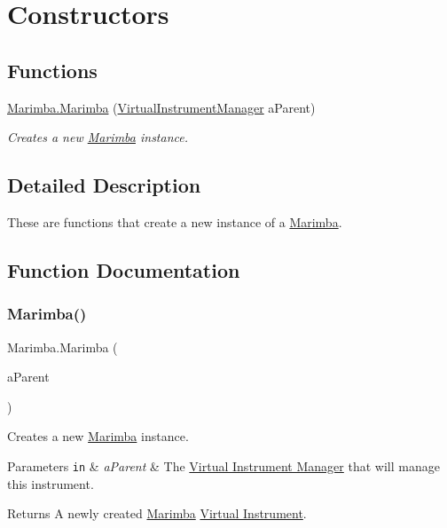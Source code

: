 \hypertarget{group___mar_construct}{}\section{Constructors}
\label{group___mar_construct}
\subsection*{Functions}
\begin{DoxyCompactItemize}
\item 
\hyperlink{group___mar_construct_ga48c946fe0f78f8905a8e4d063cbc0fa2}{Marimba.\+Marimba} (\hyperlink{class_virtual_instrument_manager}{Virtual\+Instrument\+Manager} a\+Parent)
\begin{DoxyCompactList}\small\item\em Creates a new \hyperlink{class_marimba}{Marimba} instance. \end{DoxyCompactList}\end{DoxyCompactItemize}


\subsection{Detailed Description}
These are functions that create a new instance of a \hyperlink{class_marimba}{Marimba}. 

\subsection{Function Documentation}
\mbox{\label{group___mar_construct_ga48c946fe0f78f8905a8e4d063cbc0fa2}} 
\subsubsection{\texorpdfstring{Marimba()}{Marimba()}}
{\footnotesize\ttfamily Marimba.\+Marimba (\begin{DoxyParamCaption}\item[{\hyperlink{class_virtual_instrument_manager}{Virtual\+Instrument\+Manager}}]{a\+Parent }\end{DoxyParamCaption})}



Creates a new \hyperlink{class_marimba}{Marimba} instance. 


\begin{DoxyParams}[1]{Parameters}
\mbox{\tt in}  & {\em a\+Parent} & The \hyperlink{group___v_i_m}{Virtual Instrument Manager} that will manage this instrument. \\
\hline
\end{DoxyParams}
\begin{DoxyReturn}{Returns}
A newly created \hyperlink{class_marimba}{Marimba} \hyperlink{group___v_i}{Virtual Instrument}. 
\end{DoxyReturn}


